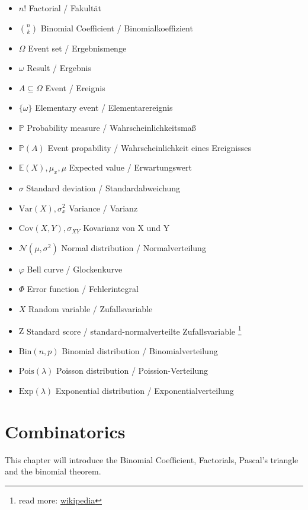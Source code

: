 \documentclass[twoside, a4paper, twocolumn]{article}
\begin{document}
    \begin{itemize}
       \item $n!$ Factorial / Fakultät
       \item $\binom{n}{k}$ Binomial Coefficient / Binomialkoeffizient
       \item $\Omega$ Event set / Ergebnismenge
       \item $\omega$ Result / Ergebnis
       \item $A \subseteq \Omega$ Event / Ereignis
       \item $\{\omega\}$ Elementary event / Elementarereignis
       \item $\mathbb{P}$ Probability measure / Wahrscheinlichkeitsmaß
       \item $\mathbb{P}(A)$ Event propability / Wahrscheinlichkeit eines Ereignisses
       \item $\mathbb{E}(X), \mu_x, \mu$ Expected value / Erwartungswert
       \item $\sigma$ Standard deviation / Standardabweichung
       \item $\mathrm{Var}(X), \sigma^2_x$ Variance / Varianz
       \item $\mathrm{Cov}(X,Y), \sigma_{XY}$ Kovarianz von X und Y
       \item $\mathcal{N}(\mu, \sigma^2)$ Normal distribution / Normalverteilung
       \item $\varphi$ Bell curve / Glockenkurve
       \item $\Phi$ Error function / Fehlerintegral
       \item $X$ Random variable / Zufallsvariable
       \item $\mathrm{Z}$ Standard score / standard-normalverteilte
           Zufallsvariable
           \footnote{read more: \href{https://en.wikipedia.org/wiki/Standard_score}{wikipedia}}
       \item $\textrm{Bin}(n, p)$ Binomial distribution / Binomialverteilung
       \item $\textrm{Pois}(\lambda)$ Poisson distribution / Poission-Verteilung
       \item $\textrm{Exp}(\lambda)$ Exponential distribution / Exponentialverteilung
    \end{itemize}

    \section{Combinatorics}
    This chapter will introduce the Binomial Coefficient, Factorials, Pascal's
    triangle and the binomial theorem.
\end{document}
